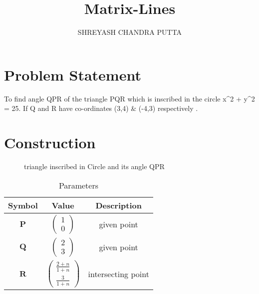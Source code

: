 \documentclass[journal,12pt,twocolumn]{article}
\title{
Matrix-Lines
}
\author{SHREYASH CHANDRA PUTTA}
\newcommand{\myvec}[1]{\ensuremath{\begin{pmatrix}#1\end{pmatrix}}}
\let\vec\mathbf
\begin{document}
\maketitle
\tableofcontents
\bigskip
\section{Problem Statement}
To find angle QPR of the triangle PQR which is inscribed in the circle x^2 + y^2 = 25. If Q and R  have  co-ordinates (3,4) & (-4,3) respectively .\\
\section{Construction}
\begin{figure}[h]
    \centering
    \caption{triangle inscribed in Circle and its angle QPR }
    \label{fig:my_label}
\end{figure}
\vspace{2cm}
\begin{table}[h]
    \centering
    \begin{tabular}{|c|c|c|}
       \hline
       \textbf{Symbol}&\textbf{Value}&\textbf{Description}  \\
       \hline
	    $\vec{P}$ & $\myvec{
		    1\\
		    0}$
	    & given point\\
        \hline
	    $\vec{Q}$ & $\myvec{2\\3}$
 & given point\\
        \hline
	    $\vec{R}$ & $\myvec{
  \frac{2+n}{1+n}\\
  \frac{3}{1+n}}$
 & intersecting point  \\
       \hline
    \end{tabular}
    \caption{Parameters}
    \label{tab:my_label}
\end{table}
\end{document}
